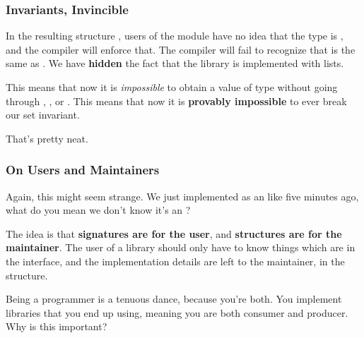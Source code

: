 \documentclass[aspectratio=169]{beamer}
\begin{document}
\begin{frame}[fragile]
  \frametitle{Invariants, Invincible}

  In the resulting structure , users of the module have
  no idea that the type  is , and the compiler will 
  enforce that. The compiler will fail to recognize that 
  is the same as . We have \textbf{hidden} the fact that the
   library is implemented with lists.

  \vspace{\fill}

  This means that now it is \textit{impossible} to obtain a value of type
   without going through , 
  , or . This means that
  now it is \textbf{provably impossible} to ever break our set invariant.

  That's pretty neat.
\end{frame}

\begin{frame}[fragile]
  \frametitle{On Users and Maintainers}

  Again, this might seem strange. We just implemented  as an 
   like five minutes ago, what do you mean we don't know it's an
  ?

  \vspace{\fill}

  The idea is that \textbf{signatures are for the user}, and \textbf{structures
  are for the maintainer}. The user of a library should only have to know things 
  which are in the interface, and the implementation details are left to the
  maintainer, in the structure.

  \vspace{\fill}

  Being a programmer is a tenuous dance, because you're both. You implement libraries
  that you end up using, meaning you are both consumer and producer. Why is this
  important?
\end{frame}
\end{document}
